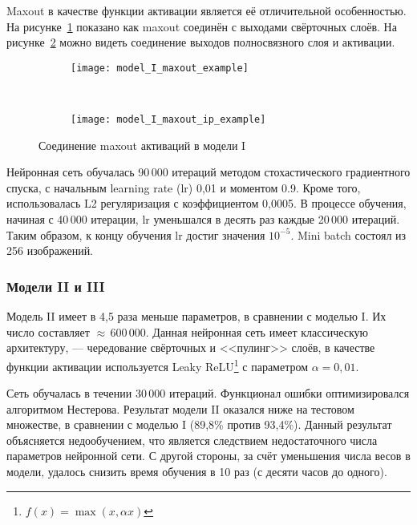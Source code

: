 Maxout в качестве функции активации является её отличительной особенностью.
На рисунке~\ref{fig:model_I_maxout_example} показано как maxout соединён с выходами свёрточных слоёв. На
рисунке~\ref{fig:model_I_maxout_ip_example} можно видеть соединение выходов полносвязного слоя и активации.
\begin{figure}[h]
    \centering
    \begin{subfigure}[b]{0.5\textwidth}
        \texttt{[image: model\_I\_maxout\_example]}
        \vspace*{0.13cm}
        \subcaption{}
        \label{fig:model_I_maxout_example}
    \end{subfigure}~
    \begin{subfigure}[b]{0.5\textwidth}
        \texttt{[image: model\_I\_maxout\_ip\_example]}
        \subcaption{}
        \label{fig:model_I_maxout_ip_example}
    \end{subfigure}
    \caption{Соединение maxout активаций в модели I}
    \label{fig:maxout_model_I}
\end{figure}

Нейронная сеть обучалась 90\,000 итераций методом стохастического градиентного спуска,
с начальным learning rate (lr) 0,01 и моментом 0.9. Кроме того, использовалась L2 регуляризация с коэффициентом 0,0005.
В процессе обучения, начиная с 40\,000 итерации, lr уменьшался в десять раз каждые 20\,000 итераций.
Таким образом, к концу обучения lr достиг значения $10^{-5}$. Mini batch состоял из 256 изображений.

\subsubsection{Модели II и III}
Модель II имеет в 4,5 раза меньше параметров, в сравнении с моделью I. Их число составляет $\approx$\,600\,000.
Данная нейронная сеть имеет классическую архитектуру, --- чередование свёрточных и <<пулинг>> слоёв, в качестве
функции активации используется Leaky ReLU\footnote{$f(x) = \max(x, \alpha x)$} с параметром $\alpha = 0,01$.

Сеть обучалась в течении 30\,000 итераций. Функционал ошибки оптимизировался алгоритмом Нестерова.
Результат модели II оказался ниже на тестовом множестве, в сравнении с моделью I (89,8\% против 93,4\%).
Данный результат объясняется недообучением, что является следствием недостаточного числа параметров нейронной сети.
С другой стороны, за счёт уменьшения числа весов в модели, удалось снизить время обучения в 10 раз (с десяти часов до одного).

